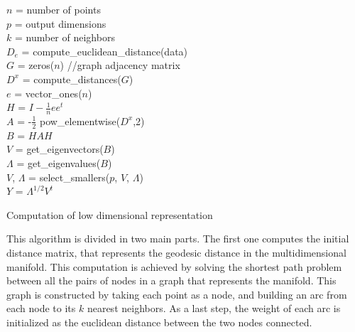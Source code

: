 \documentclass[12pt,journal]{IEEEtran}
\begin{document}
\begin{algorithm}
    $n$ = number of points\\
    $p$ = output dimensions\\
    $k$ = number of neighbors\\
    \vspace{0.5cm}
    $D_e$ = compute\_euclidean\_distance(data)\\
    $G$ = zeros($n$) //graph adjacency matrix\\
    \vspace{0.5cm}
    $D^x$ = compute\_distances($G$)\\
    \vspace{0.5cm}
    $e$ = vector\_ones($n$)\\
    $H$ = $I - \frac{1}{n} e e^t$\\
    $A$ = -$\frac{1}{2}$ pow\_elementwise($D^x$,2)\\
    $B$ = $HAH$\\
    $V$ = get\_eigenvectors($B$)\\
    $\Lambda$ = get\_eigenvalues($B$)\\
    $V$, $\Lambda$ = select\_smallers($p$, $V$, $\Lambda$)\\
    $Y$ = $\Lambda^{1/2} V^t$

    \vspace{0.5cm}

    \caption{Computation of low dimensional representation}
    \label{alg1}
\end{algorithm}

This algorithm is divided in two main parts. The first one computes the initial
distance matrix, that represents the geodesic distance in the multidimensional
manifold. This computation is achieved by solving the shortest path problem
between all the pairs of nodes in a graph that represents the manifold. This
graph is constructed by taking each point as a node, and building an arc from
each node to its $k$ nearest neighbors. As a last step, the weight of each arc
is initialized as the euclidean distance between the two nodes connected.

\vspace{0.5cm}
\end{document}
